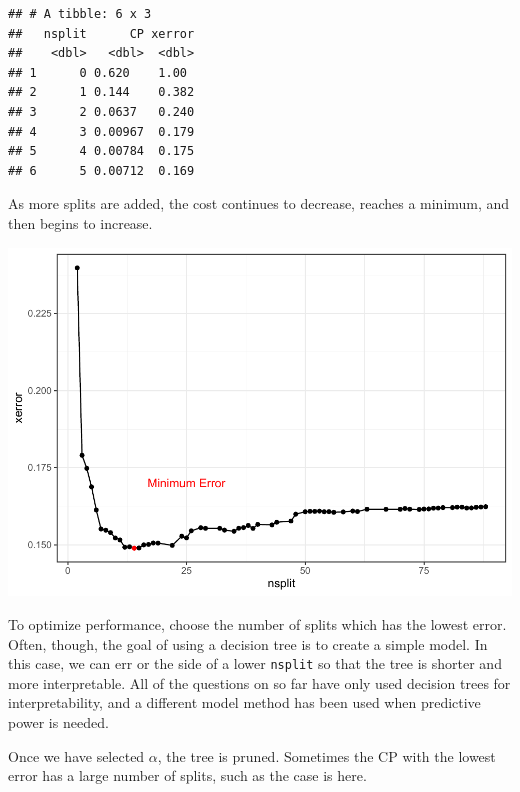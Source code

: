 \documentclass[openany]{book}
\newenvironment{Shaded}{\begin{snugshade}}{\end{snugshade}}
\newcommand{\KeywordTok}[1]{\textcolor[rgb]{0.13,0.29,0.53}{\textbf{#1}}}
\newcommand{\NormalTok}[1]{#1}
\newcommand{\OperatorTok}[1]{\textcolor[rgb]{0.81,0.36,0.00}{\textbf{#1}}}
\newcommand{\StringTok}[1]{\textcolor[rgb]{0.31,0.60,0.02}{#1}}
\begin{document}
\begin{verbatim}
## # A tibble: 6 x 3
##   nsplit      CP xerror
##    <dbl>   <dbl>  <dbl>
## 1      0 0.620    1.00 
## 2      1 0.144    0.382
## 3      2 0.0637   0.240
## 4      3 0.00967  0.179
## 5      4 0.00784  0.175
## 6      5 0.00712  0.169
\end{verbatim}

As more splits are added, the cost continues to decrease, reaches a minimum, and then begins to increase.

\includegraphics{06-tree-based-models_files/figure-latex/unnamed-chunk-6-1.pdf}

To optimize performance, choose the number of splits which has the lowest error. Often, though, the goal of using a decision tree is to create a simple model. In this case, we can err or the side of a lower \texttt{nsplit} so that the tree is shorter and more interpretable. All of the questions on so far have only used decision trees for interpretability, and a different model method has been used when predictive power is needed.

Once we have selected \(\alpha\), the tree is pruned. Sometimes the CP with the lowest error has a large number of splits, such as the case is here.

\begin{Shaded}
\end{Shaded}
\end{document}
